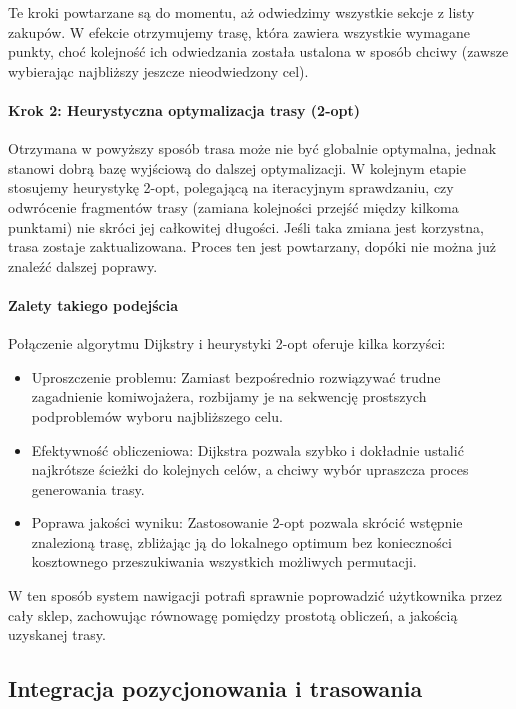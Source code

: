 Te kroki powtarzane są do momentu, aż odwiedzimy wszystkie sekcje z listy zakupów. W efekcie otrzymujemy trasę, która zawiera wszystkie wymagane punkty, choć kolejność ich odwiedzania została ustalona w sposób chciwy (zawsze wybierając najbliższy jeszcze nieodwiedzony cel).

\paragraph{Krok 2: Heurystyczna optymalizacja trasy (2-opt)}
Otrzymana w powyższy sposób trasa może nie być globalnie optymalna, jednak stanowi dobrą bazę wyjściową do dalszej optymalizacji. W kolejnym etapie stosujemy heurystykę 2-opt, polegającą na iteracyjnym sprawdzaniu, czy odwrócenie fragmentów trasy (zamiana kolejności przejść między kilkoma punktami) nie skróci jej całkowitej długości. Jeśli taka zmiana jest korzystna, trasa zostaje zaktualizowana. Proces ten jest powtarzany, dopóki nie można już znaleźć dalszej poprawy.

\paragraph{Zalety takiego podejścia}
Połączenie algorytmu Dijkstry i heurystyki 2-opt oferuje kilka korzyści:
\begin{itemize}
    \item Uproszczenie problemu: Zamiast bezpośrednio rozwiązywać trudne zagadnienie komiwojażera, rozbijamy je na sekwencję prostszych podproblemów wyboru najbliższego celu.
    \item Efektywność obliczeniowa: Dijkstra pozwala szybko i dokładnie ustalić najkrótsze ścieżki do kolejnych celów, a chciwy wybór upraszcza proces generowania trasy.
    \item Poprawa jakości wyniku: Zastosowanie 2-opt pozwala skrócić wstępnie znalezioną trasę, zbliżając ją do lokalnego optimum bez konieczności kosztownego przeszukiwania wszystkich możliwych permutacji.
\end{itemize}

W ten sposób system nawigacji potrafi sprawnie poprowadzić użytkownika przez cały sklep, zachowując równowagę pomiędzy prostotą obliczeń, a jakością uzyskanej trasy.

\subsection{Integracja pozycjonowania i trasowania}

